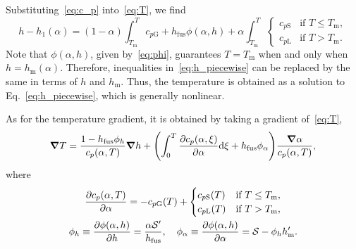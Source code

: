 \documentclass[final]{elsarticle} %
\newcommand{\fusion}[1]{{#1}_\text{fus}}
\newcommand{\sol}{\text{S}}
\newcommand{\liq}{\text{L}}
\newcommand{\gas}{\text{G}}
\newcommand{\melt}{\text{m}}
\begin{document}
Substituting~\eqref{eq:c_p} into~\eqref{eq:T}, we find
\begin{equation}\label{eq:h_piecewise}
    h - h_1(\alpha) = (1-\alpha)\int_{T_\melt}^T c_{p\gas} + \fusion{h}\phi(\alpha,h)
        + \alpha\int_{T_\melt}^T
    \begin{cases}
        c_{p\sol} &\text{if } T \leq T_\melt, \\
        c_{p\liq} &\text{if } T > T_\melt.
    \end{cases}
\end{equation}
Note that $\phi(\alpha,h)$, given by~\eqref{eq:phi},
guarantees $T=T_\melt$ when and only when $h=h_\melt(\alpha)$.
Therefore, inequalities in~\eqref{eq:h_piecewise} can be replaced by the same
in terms of $h$ and $h_\melt$.
Thus, the temperature is obtained as a solution to Eq.~\eqref{eq:h_piecewise},
which is generally nonlinear.

As for the temperature gradient, it is obtained by taking a gradient of~\eqref{eq:T},
\begin{equation}\label{eq:T_gradient}
    \grad{T} = \frac{1 - \fusion{h}\phi_h}{c_p(\alpha,T)}\grad{h}
        + \qty(
            \int_0^T \pdv{c_p(\alpha,\xi)}{\alpha}\dd\xi + \fusion{h}\phi_\alpha
        )\frac{\grad\alpha}{c_p(\alpha,T)},
\end{equation}
where
\begin{gather}
    \pdv{c_p(\alpha,T)}{\alpha} = -c_{p\gas}(T) +
        \begin{cases}
            c_{p\sol}(T) &\text{if } T \leq T_\melt, \\
            c_{p\liq}(T) &\text{if } T > T_\melt,
        \end{cases} \label{eq:c_palpha}\\
    \phi_h \equiv \pdv{\phi(\alpha,h)}{h} = \frac{\alpha\mathcal{S}'}{\fusion{h}}, \quad
    \phi_\alpha \equiv \pdv{\phi(\alpha,h)}{\alpha} = \mathcal{S} - \phi_h h_\melt'. \label{eq:phi_derivatives}
\end{gather}
\end{document}
